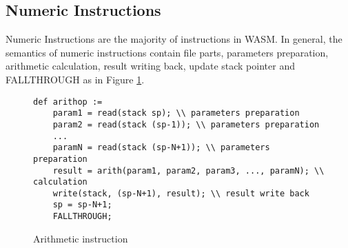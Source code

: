 \subsection{Numeric Instructions}
\label{chp:numeric-instruction}
Numeric Instructions are the majority of instructions in WASM. In general, the semantics of numeric instructions contain file parts, parameters preparation, arithmetic calculation, result writing back, update stack pointer and FALLTHROUGH as in Figure \ref{fig:ins-arith}.
\begin{figure}[h!]
\small
\centering
\begin{verbatim}
def arithop :=
    param1 = read(stack sp); \\ parameters preparation
    param2 = read(stack (sp-1)); \\ parameters preparation
    ...
    paramN = read(stack (sp-N+1)); \\ parameters preparation
    result = arith(param1, param2, param3, ..., paramN); \\ calculation
    write(stack, (sp-N+1), result); \\ result write back
    sp = sp-N+1;
    FALLTHROUGH;
\end{verbatim}
\caption{Arithmetic instruction}
\label{fig:ins-arith}
\end{figure}

